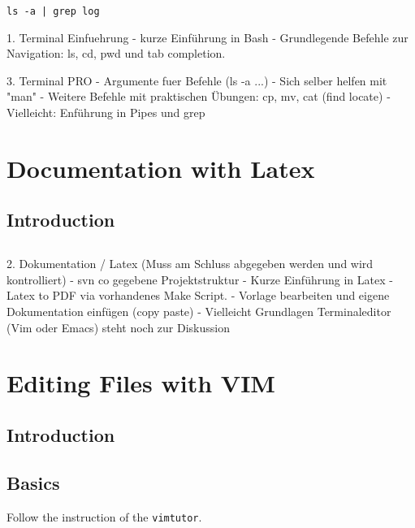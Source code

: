 \documentclass[10pt,a4paper]{scrartcl}
\begin{document}
\texttt{ls -a | grep log}


1. Terminal Einfuehrung
- kurze Einführung in Bash
- Grundlegende Befehle zur Navigation: ls, cd, pwd und tab completion.

3. Terminal PRO
- Argumente fuer Befehle (ls -a ...)
- Sich selber helfen mit "man"
- Weitere Befehle mit praktischen Übungen: cp, mv, cat (find locate)
- Vielleicht: Enführung in Pipes und grep

\section{Documentation with Latex}
\subsection{Introduction}

\subsection{}
2. Dokumentation / Latex (Muss am Schluss abgegeben werden und wird  kontrolliert)
- svn co gegebene Projektstruktur
- Kurze Einführung in Latex
- Latex to PDF via vorhandenes Make Script.
- Vorlage bearbeiten und eigene Dokumentation einfügen (copy paste)
- Vielleicht Grundlagen Terminaleditor (Vim oder Emacs) steht noch  zur Diskussion


\section{Editing Files with VIM}
\subsection{Introduction}

\subsection{Basics}
Follow the instruction of the \texttt{vimtutor}.
\end{document}
